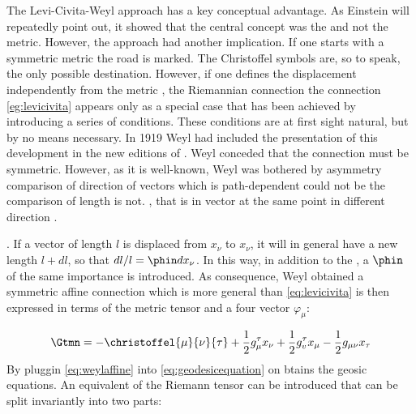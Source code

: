 {The Levi-Civita-Weyl approach has a key conceptual advantage. As Einstein will repeatedly point out, it showed that the central concept was the  and not the metric. However, the approach had another implication. If one starts with a symmetric metric \gmn the road is marked. The Christoffel symbols are, so to speak, the only possible destination. However, if one defines the displacement \Gtmn independently from the metric \gmn, the Riemannian connection the connection \cref{eg:levicivita} appears only as a special case that has been achieved by introducing a series of conditions. These conditions are at first sight natural, but by no means necessary. In 1919 Weyl had included the presentation of this development in the new editions of  \citep{Weyl1919}. Weyl conceded that the connection must be symmetric. However, as it is well-known, Weyl was bothered by asymmetry comparison of direction of vectors which is path-dependent could not be the comparison of length is not. , that is in vector at the same point in different direction \citep[102]{Weyl1919a}.


. If a vector of length $l$ is displaced from $x_\nu$ to $x_\nu$, it will in general have a new length $l+dl$, so that $dl/l=\phin dx_\nu$. In this way, in addition to the  \gmn, a  $\phin$ of the same importance is introduced. As consequence, Weyl obtained a  symmetric affine connection which is more general than \cref{eq:levicivita} \citep[112]{Weyl1919} is then expressed in terms of the metric tensor and a four vector $\varphi_{\mu}$:

\begin{equation*}\label{eq:weylaffine}
\Gtmn = - \christoffel{\mu}{\nu}{\tau} +\frac{1}{2} g_{\mu}^{\tau} x_{\nu}+\frac{1}{2} g_{v}^{\tau} x_{\mu}-\frac{1}{2} g_{\mu \nu} x_\tau
\end{equation*}
%
By pluggin \cref{eq:weylaffine} into \cref{eq:geodesicequation} on btains the geosic equations.  An equivalent of the Riemann tensor \riteg can be introduced that can be split invariantly into two parts:

}
